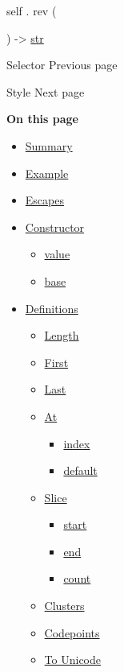 self { . } { rev } (

) -\textgreater{} \href{/docs/reference/foundations/str/}{str}

\href{/docs/reference/foundations/selector/}{\pandocbounded{}}

{ Selector } { Previous page }

\href{/docs/reference/foundations/style/}{\pandocbounded{}}

{ Style } { Next page }

\textbf{On this page}

\begin{itemize}
\tightlist
\item
  \hyperref[summary]{Summary}
\item
  \hyperref[example]{Example}
\item
  \hyperref[escapes]{Escapes}
\item
  \hyperref[constructor]{Constructor}

  \begin{itemize}
  \tightlist
  \item
    \hyperref[constructor-value]{value}
  \item
    \hyperref[constructor-base]{base}
  \end{itemize}
\item
  \hyperref[definitions]{Definitions}

  \begin{itemize}
  \tightlist
  \item
    \hyperref[definitions-len]{Length}
  \item
    \hyperref[definitions-first]{First}
  \item
    \hyperref[definitions-last]{Last}
  \item
    \hyperref[definitions-at]{At}

    \begin{itemize}
    \tightlist
    \item
      \hyperref[definitions-at-index]{index}
    \item
      \hyperref[definitions-at-default]{default}
    \end{itemize}
  \item
    \hyperref[definitions-slice]{Slice}

    \begin{itemize}
    \tightlist
    \item
      \hyperref[definitions-slice-start]{start}
    \item
      \hyperref[definitions-slice-end]{end}
    \item
      \hyperref[definitions-slice-count]{count}
    \end{itemize}
  \item
    \hyperref[definitions-clusters]{Clusters}
  \item
    \hyperref[definitions-codepoints]{Codepoints}
  \item
    \hyperref[definitions-to-unicode]{To Unicode}


\end{itemize}
\end{itemize}
